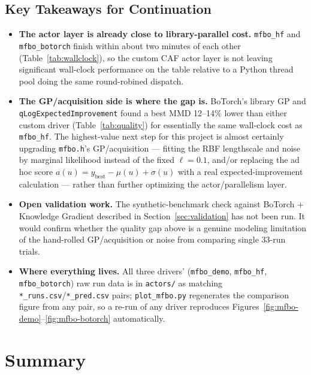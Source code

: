 \documentclass[11pt]{article}
\begin{document}
\subsection{Key Takeaways for Continuation}
\label{sec:takeaways}

\begin{itemize}
  \item \textbf{The actor layer is already close to library-parallel
    cost.} \texttt{mfbo\_hf} and \texttt{mfbo\_botorch} finish within
    about two minutes of each other (Table~\ref{tab:wallclock}), so the
    custom CAF actor layer is not leaving significant wall-clock
    performance on the table relative to a Python thread pool doing the
    same round-robined dispatch.
  \item \textbf{The GP/acquisition side is where the gap is.} BoTorch's
    library GP and \texttt{qLogExpectedImprovement} found a best MMD
    12--14\% lower than either custom driver
    (Table~\ref{tab:quality}) for essentially the same wall-clock cost as
    \texttt{mfbo\_hf}. The highest-value next step for this project is
    almost certainly upgrading \texttt{mfbo.h}'s GP/acquisition —
    fitting the RBF lengthscale and noise by marginal likelihood instead
    of the fixed $\ell = 0.1$, and/or replacing the ad hoc score
    $a(u) = y_{\text{best}} - \mu(u) + \sigma(u)$ with a real expected-improvement
    calculation — rather than further optimizing the actor/parallelism
    layer.
  \item \textbf{Open validation work.} The synthetic-benchmark check
    against BoTorch + Knowledge Gradient described in
    Section~\ref{sec:validation} has not been run. It would confirm
    whether the quality gap above is a genuine modeling limitation of the
    hand-rolled GP/acquisition or noise from comparing single 33-run
    trials.
  \item \textbf{Where everything lives.} All three drivers'
    (\texttt{mfbo\_demo}, \texttt{mfbo\_hf}, \texttt{mfbo\_botorch}) raw
    run data is in \texttt{actors/} as matching
    \texttt{*\_runs.csv}/\texttt{*\_pred.csv} pairs; \texttt{plot\_mfbo.py}
    regenerates the comparison figure from any pair, so a re-run of any
    driver reproduces Figures~\ref{fig:mfbo-demo}--\ref{fig:mfbo-botorch}
    automatically.
\end{itemize}

\section{Summary}
\end{document}

